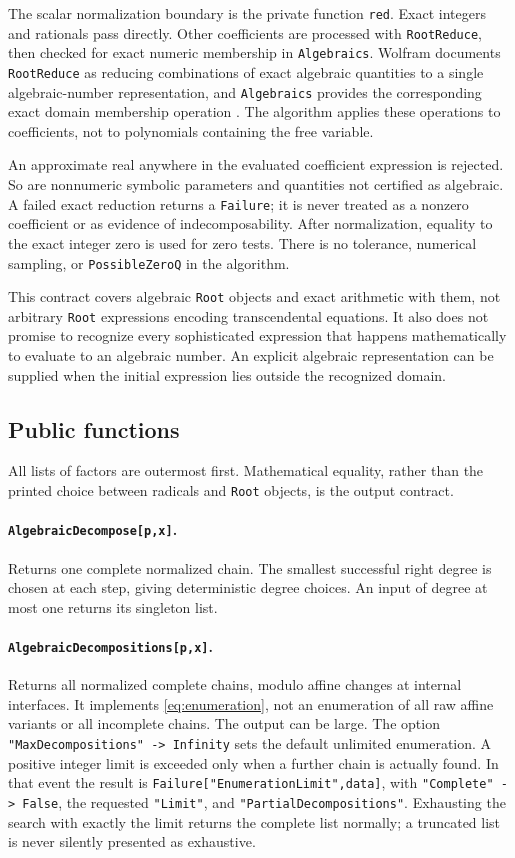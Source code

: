 \documentclass[11pt,a4paper]{article}
\numberwithin{equation}{section}
\theoremstyle{definition}
\theoremstyle{remark}
\newcommand{\code}[1]{\texttt{#1}}
\begin{document}
The scalar normalization boundary is the private function \code{red}. Exact
integers and rationals pass directly. Other coefficients are processed with
\code{RootReduce}, then checked for exact numeric membership in
\code{Algebraics}. Wolfram documents \code{RootReduce} as reducing combinations
of exact algebraic quantities to a single algebraic-number representation,
and \code{Algebraics} provides the corresponding exact domain membership
operation \cite{RootReduce,Algebraics}. The algorithm applies these operations
to coefficients, not to polynomials containing the free variable.

An approximate real anywhere in the evaluated coefficient expression is
rejected. So are nonnumeric symbolic parameters and quantities not certified
as algebraic. A failed exact reduction returns a \code{Failure}; it is never
treated as a nonzero coefficient or as evidence of indecomposability. After
normalization, equality to the exact integer zero is used for zero tests.
There is no tolerance, numerical sampling, or \code{PossibleZeroQ} in the
algorithm.

This contract covers algebraic \code{Root} objects and exact arithmetic with
them, not arbitrary \code{Root} expressions encoding transcendental equations.
It also does not promise to recognize every sophisticated expression that
happens mathematically to evaluate to an algebraic number. An explicit
algebraic representation can be supplied when the initial expression lies
outside the recognized domain.

\subsection{Public functions}
All lists of factors are outermost first. Mathematical equality, rather than
the printed choice between radicals and \code{Root} objects, is the output
contract.

\paragraph{\code{AlgebraicDecompose[p,x]}.}
Returns one complete normalized chain. The smallest successful right degree
is chosen at each step, giving deterministic degree choices. An input of
degree at most one returns its singleton list.

\paragraph{\code{AlgebraicDecompositions[p,x]}.}
Returns all normalized complete chains, modulo affine changes at internal
interfaces. It implements \eqref{eq:enumeration}, not an enumeration of all
raw affine variants or all incomplete chains. The output can be large.
The option \code{"MaxDecompositions" -> Infinity} sets the default unlimited
enumeration. A positive integer limit is exceeded only when a further chain
is actually found. In that event the result is
\code{Failure["EnumerationLimit",data]}, with \code{"Complete" -> False},
the requested \code{"Limit"}, and \code{"PartialDecompositions"}. Exhausting
the search with exactly the limit returns the complete list normally; a
truncated list is never silently presented as exhaustive.
\end{document}
